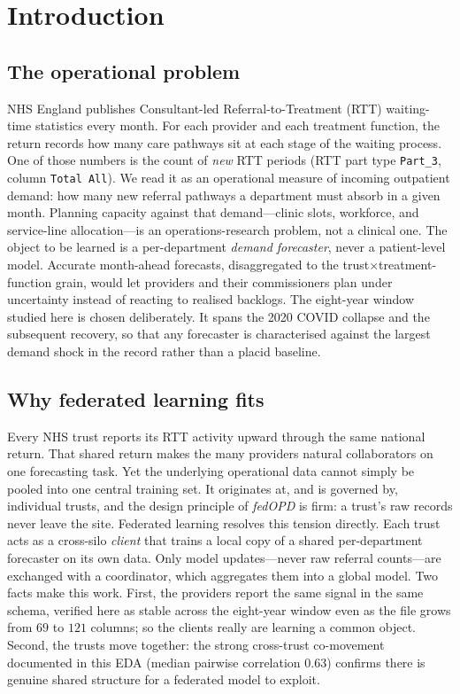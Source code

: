 \documentclass[11pt,a4paper]{article}
\begin{document}
\tableofcontents
\clearpage

\section{Introduction}\label{sec:intro}

\subsection{The operational problem}
NHS England publishes Consultant-led Referral-to-Treatment (RTT) waiting-time statistics every month. For each provider and each treatment function, the return records how many care pathways sit at each stage of the waiting process. One of those numbers is the count of \emph{new} RTT periods (RTT part type \texttt{Part\_3}, column \texttt{Total All}). We read it as an operational measure of incoming outpatient demand: how many new referral pathways a department must absorb in a given month. Planning capacity against that demand---clinic slots, workforce, and service-line allocation---is an operations-research problem, not a clinical one. The object to be learned is a per-department \emph{demand forecaster}, never a patient-level model. Accurate month-ahead forecasts, disaggregated to the trust$\times$treatment-function grain, would let providers and their commissioners plan under uncertainty instead of reacting to realised backlogs. The eight-year window studied here is chosen deliberately. It spans the 2020 COVID collapse and the subsequent recovery, so that any forecaster is characterised against the largest demand shock in the record rather than a placid baseline.

\subsection{Why federated learning fits}
Every NHS trust reports its RTT activity upward through the same national return. That shared return makes the many providers natural collaborators on one forecasting task. Yet the underlying operational data cannot simply be pooled into one central training set. It originates at, and is governed by, individual trusts, and the design principle of \emph{fedOPD} is firm: a trust's raw records never leave the site. Federated learning resolves this tension directly. Each trust acts as a cross-silo \emph{client} that trains a local copy of a shared per-department forecaster on its own data. Only model updates---never raw referral counts---are exchanged with a coordinator, which aggregates them into a global model. Two facts make this work. First, the providers report the same signal in the same schema, verified here as stable across the eight-year window even as the file grows from $69$ to $121$ columns; so the clients really are learning a common object. Second, the trusts move together: the strong cross-trust co-movement documented in this EDA (median pairwise correlation $0.63$) confirms there is genuine shared structure for a federated model to exploit.
\end{document}
